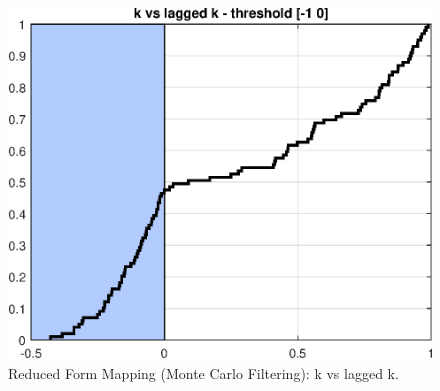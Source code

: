 
\begin{figure}[H]
\centering 
\includegraphics[width=1.00\textwidth]{RBC_kz/gsa/redform_prior/k_vs_k_threshold/RBC_kz_prior_k_vs_k}
\caption{Reduced Form Mapping (Monte Carlo Filtering): k vs lagged k.}\label{Fig:prior_k_vs_k}
\end{figure}

